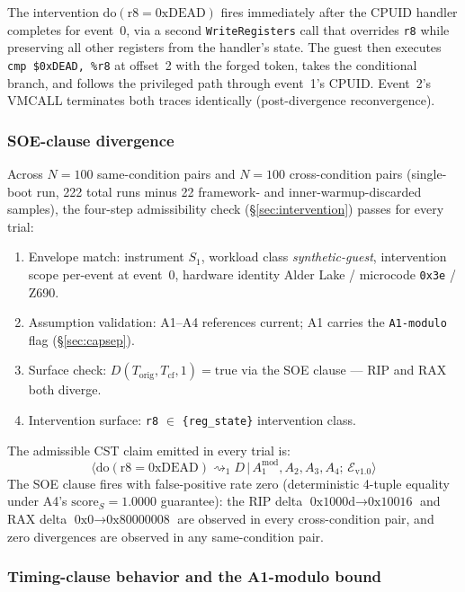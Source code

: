 \documentclass[conference]{IEEEtran}
\newcommand{\Korig}{T_\text{orig}}
\newcommand{\Tcf}{T_\text{cf}}
\newcommand{\scoreS}{\text{score}_S}
\begin{document}
The intervention $\text{do}(\text{r8}{=}\text{0xDEAD})$ fires
immediately after the CPUID handler completes for event~0, via a
second \texttt{WriteRegisters} call that overrides \texttt{r8} while
preserving all other registers from the handler's state. The guest
then executes \texttt{cmp \$0xDEAD, \%r8} at offset~2 with the
forged token, takes the conditional branch, and follows the
privileged path through event~1's CPUID. Event~2's VMCALL terminates
both traces identically (post-divergence reconvergence).

\subsubsection{SOE-clause divergence}

Across $N{=}100$ same-condition pairs and $N{=}100$ cross-condition
pairs (single-boot run, 222 total runs minus 22 framework- and
inner-warmup-discarded samples), the four-step admissibility check
(\S\ref{sec:intervention}) passes for every trial:
\begin{enumerate}[label=(\arabic*)]
\item Envelope match: instrument $S_1$, workload class
  \textit{synthetic-guest}, intervention scope per-event at event~0,
  hardware identity Alder Lake / microcode \texttt{0x3e} / Z690.
\item Assumption validation: A1--A4 references current; A1 carries
  the \texttt{A1-modulo} flag (\S\ref{sec:capsep}).
\item Surface check: $D(\Korig, \Tcf, 1) = \text{true}$ via the SOE
  clause --- RIP and RAX both diverge.
\item Intervention surface: \texttt{r8} $\in$ \texttt{\{reg\_state\}}
  intervention class.
\end{enumerate}
The admissible CST claim emitted in every trial is:
\begin{equation*}
\big\langle \text{do}(\text{r8}{=}\text{0xDEAD}) \rightsquigarrow_{1}
D \,\big|\, A_1^{\text{mod}}, A_2, A_3, A_4;\, \mathcal{E}_{\text{v1.0}} \big\rangle
\end{equation*}
The SOE clause fires with false-positive rate zero (deterministic
4-tuple equality under A4's $\scoreS{=}1.0000$ guarantee): the RIP
delta $\text{0x1000d} \to \text{0x10016}$ and RAX delta
$\text{0x0} \to \text{0x80000008}$ are observed in every
cross-condition pair, and zero divergences are observed in any
same-condition pair.

\subsubsection{Timing-clause behavior and the A1-modulo bound}
\end{document}
